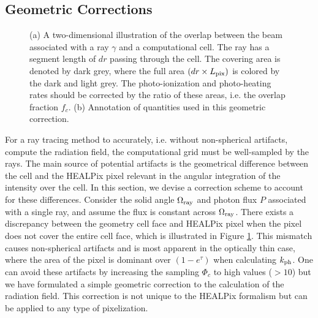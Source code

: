 \documentclass[useAMS,usenatbib,a4paper]{mn2e}
\begin{document}
\subsection{Geometric Corrections}
\label{sec:meth_fc}

\begin{figure}
  \caption{\label{fig:covering} (a) A two-dimensional illustration of
    the overlap between the beam associated with a ray $\gamma$ and a
    computational cell.  The ray has a segment length of $dr$ passing
    through the cell.  The covering area is denoted by dark grey,
    where the full area $(dr \times L_{\rm pix})$ is colored by the
    dark and light grey.  The photo-ionization and photo-heating rates
    should be corrected by the ratio of these areas, i.e. the overlap
    fraction $f_c$.  (b) Annotation of quantities used in this
    geometric correction.}
\end{figure}

For a ray tracing method to accurately, i.e. without non-spherical
artifacts, compute the radiation field, the computational grid must be
well-sampled by the rays.  The main source of potential artifacts is
the geometrical difference between the cell and the HEALPix pixel
relevant in the angular integration of the intensity over the cell.
In this section, we devise a correction scheme to account for these
differences.  Consider the solid angle $\Omega_{\rm ray}$ and photon
flux $P$ associated with a single ray, and assume the flux is constant
across $\Omega_{\rm ray}$.  There exists a discrepancy between the
geometry cell face and HEALPix pixel when the pixel does not cover the
entire cell face, which is illustrated in Figure \ref{fig:covering}.
This mismatch causes non-spherical artifacts and is most apparent in
the optically thin case, where the area of the pixel is dominant over
$(1 - e^\tau)$ when calculating $k_{\rm ph}$.  One can avoid these
artifacts by increasing the sampling $\Phi_c$ to high values ($>10$)
but we have formulated a simple geometric correction to the
calculation of the radiation field.  This correction is not unique to
the HEALPix formalism but can be applied to any type of pixelization.
\end{document}
